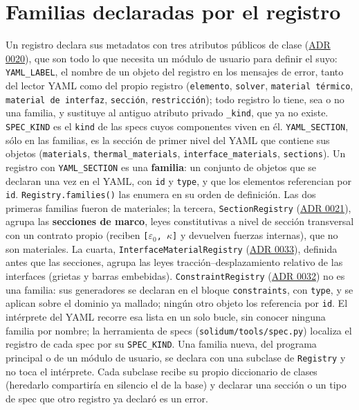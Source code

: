 \documentclass[11pt,oneside]{report}
\begin{document}
\section{Familias declaradas por el registro}

Un registro declara sus metadatos con tres atributos públicos de clase (\hyperref[adr:0020]{ADR 0020}), que son todo lo que necesita un módulo de usuario para definir el suyo: \texttt{YAML\_LABEL}, el nombre de un objeto del registro en los mensajes de error, tanto del lector YAML como del propio registro (\texttt{\textquotedbl{}elemento\textquotedbl{}}, \texttt{\textquotedbl{}solver\textquotedbl{}}, \texttt{\textquotedbl{}material térmico\textquotedbl{}}, \texttt{\textquotedbl{}material de interfaz\textquotedbl{}}, \texttt{\textquotedbl{}sección\textquotedbl{}}, \texttt{\textquotedbl{}restricción\textquotedbl{}}); todo registro lo tiene, sea o no una familia, y sustituye al antiguo atributo privado \texttt{\_kind}, que ya no existe. \texttt{SPEC\_KIND} es el \texttt{kind} de las specs cuyos componentes viven en él. \texttt{YAML\_SECTION}, sólo en las familias, es la sección de primer nivel del YAML que contiene sus objetos (\texttt{materials}, \texttt{thermal\_\allowbreak{}materials}, \texttt{interface\_\allowbreak{}materials}, \texttt{sections}). Un registro con \texttt{YAML\_SECTION} es una \textbf{familia}: un conjunto de objetos que se declaran una vez en el YAML, con \texttt{id} y \texttt{type}, y que los elementos referencian por \texttt{id}. \texttt{Registry.\allowbreak{}families()} las enumera en su orden de definición. Las dos primeras familias fueron de materiales; la tercera, \texttt{SectionRegistry} (\hyperref[adr:0021]{ADR 0021}), agrupa las \textbf{secciones de marco}, leyes constitutivas a nivel de sección transversal con un contrato propio (reciben \texttt{[\ensuremath{\varepsilon}\ensuremath{_{0}}, \ensuremath{\kappa}]} y devuelven fuerzas internas), que no son materiales. La cuarta, \texttt{InterfaceMaterialRegistry} (\hyperref[adr:0033]{ADR 0033}), definida antes que las secciones, agrupa las leyes tracción--desplazamiento relativo de las interfaces (grietas y barras embebidas). \texttt{ConstraintRegistry} (\hyperref[adr:0032]{ADR 0032}) no es una familia: sus generadores se declaran en el bloque \texttt{constraints}, con \texttt{type}, y se aplican sobre el dominio ya mallado; ningún otro objeto los referencia por \texttt{id}. El intérprete del YAML recorre esa lista en un solo bucle, sin conocer ninguna familia por nombre; la herramienta de specs (\texttt{solidum/\allowbreak{}tools/\allowbreak{}spec.\allowbreak{}py}) localiza el registro de cada spec por su \texttt{SPEC\_KIND}. Una familia nueva, del programa principal o de un módulo de usuario, se declara con una subclase de \texttt{Registry} y no toca el intérprete. Cada subclase recibe su propio diccionario de clases (heredarlo compartiría en silencio el de la base) y declarar una sección o un tipo de spec que otro registro ya declaró es un error.
\end{document}

